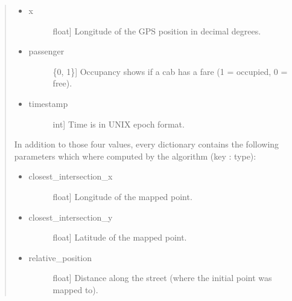 \documentclass[letterpaper,10pt,english]{sphinxmanual}
\begin{document}
\begin{fulllineitems}
\begin{quote}
\begin{description}
\begin{description}
\begin{itemize}
\begin{description}
\end{description}

\item {} \begin{description}
\item[{x}] \leavevmode{[}float{]}
Longitude of the GPS position in decimal degrees.

\end{description}

\item {} \begin{description}
\item[{passenger}] \leavevmode{[}\{0, 1\}{]}
Occupancy shows if a cab has a fare (1 = occupied, 0 = free).

\end{description}

\item {} \begin{description}
\item[{timestamp}] \leavevmode{[}int{]}
Time is in UNIX epoch format.

\end{description}

\end{itemize}

In addition to those four values, every dictionary contains the following parameters which where computed by the algorithm (key : type):
\begin{itemize}
\item {} \begin{description}
\item[{closest\_intersection\_x}] \leavevmode{[}float{]}
Longitude of the mapped point.

\end{description}

\item {} \begin{description}
\item[{closest\_intersection\_y}] \leavevmode{[}float{]}
Latitude of the mapped point.

\end{description}

\item {} \begin{description}
\item[{relative\_position}] \leavevmode{[}float{]}
Distance along the street (where the initial point was mapped to).

\end{description}


\end{itemize}
\end{description}
\end{description}
\end{quote}
\end{fulllineitems}
\end{document}
